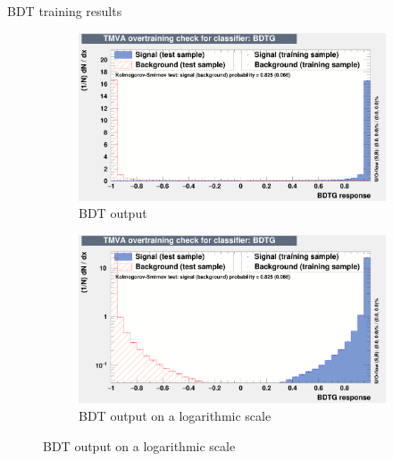 \documentclass{beamer}
\begin{document}
\begin{frame}{BDT training results}
  \begin{figure}
    \centering
    \vspace{-0.2cm}
    \begin{subfigure}{0.5\textwidth}
      \includegraphics[width = 1.0\textwidth]{Plots/BDToutput.png}
      \caption{BDT output}
    \end{subfigure}%
    \begin{subfigure}{0.5\textwidth}
      \includegraphics[width = 1.0\textwidth]{Plots/BDToutputLog.png}
      \caption{BDT output on a logarithmic scale}
    \end{subfigure}
  \end{figure}
\end{frame}
\end{document}
